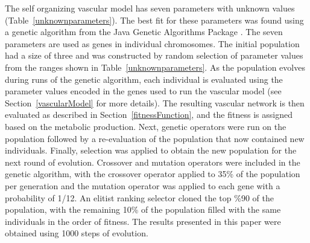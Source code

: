 The self organizing vascular model has seven parameters with unknown values
(Table~\ref{unknownparameters}). The best fit for these parameters was found using a
genetic algorithm from the Java Genetic Algorithms Package
\cite{cgl:meffert2011genetic}. The seven parameters are used as genes in individual
chromosomes. The initial population had a size of three and was constructed by random
selection of parameter values from the ranges shown in Table~\ref{unknownparameters}.
As the population evolves during runs of the genetic algorithm, each individual is
evaluated using the parameter values encoded in the genes used to run the vascular
model (see Section~\ref{vascularModel} for more details). The resulting vascular
network is then evaluated as described in Section~\ref{fitnessFunction}, and the
fitness is assigned based on the metabolic production. Next, genetic operators were
run on the population followed by a re-evaluation of the population that now
contained new individuals. Finally, selection was applied to obtain the new
population for the next round of evolution.
Crossover and mutation operators were included in the genetic algorithm, with the
crossover operator applied to 35\% of the population per generation and the mutation
operator was applied to each gene with a probability of 1/12. An elitist ranking
selector cloned the top \%90 of the population, with the remaining 10\% of the
population filled with the same individuals in the order of fitness. The results
presented in this paper were obtained using 1000 steps of evolution.



